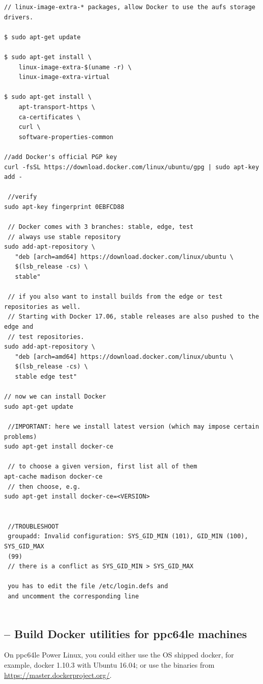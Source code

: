 \begin{verbatim}
// linux-image-extra-* packages, allow Docker to use the aufs storage drivers.

$ sudo apt-get update

$ sudo apt-get install \
    linux-image-extra-$(uname -r) \
    linux-image-extra-virtual
    
$ sudo apt-get install \
    apt-transport-https \
    ca-certificates \
    curl \
    software-properties-common

//add Docker's official PGP key    
curl -fsSL https://download.docker.com/linux/ubuntu/gpg | sudo apt-key add -

 //verify
sudo apt-key fingerprint 0EBFCD88

 // Docker comes with 3 branches: stable, edge, test
 // always use stable repository
sudo add-apt-repository \
   "deb [arch=amd64] https://download.docker.com/linux/ubuntu \
   $(lsb_release -cs) \
   stable"
   
 // if you also want to install builds from the edge or test repositories as well.
 // Starting with Docker 17.06, stable releases are also pushed to the edge and
 // test repositories.
sudo add-apt-repository \
   "deb [arch=amd64] https://download.docker.com/linux/ubuntu \
   $(lsb_release -cs) \
   stable edge test"
   
// now we can install Docker
sudo apt-get update
 
 //IMPORTANT: here we install latest version (which may impose certain problems)
sudo apt-get install docker-ce 
 
 // to choose a given version, first list all of them
apt-cache madison docker-ce
 // then choose, e.g. 
sudo apt-get install docker-ce=<VERSION>
 
 
 //TROUBLESHOOT
 groupadd: Invalid configuration: SYS_GID_MIN (101), GID_MIN (100), SYS_GID_MAX
 (99)
 // there is a conflict as SYS_GID_MIN > SYS_GID_MAX
 
 you has to edit the file /etc/login.defs and 
 and uncomment the corresponding line
  
\end{verbatim}

\subsection{-- Build Docker utilities for ppc64le machines}
\label{sec:docker-ppc64le}


On ppc64le Power Linux, you could either use the OS shipped docker, for example,
docker 1.10.3 with Ubuntu 16.04; or use the binaries from
\url{https://master.dockerproject.org/}.



